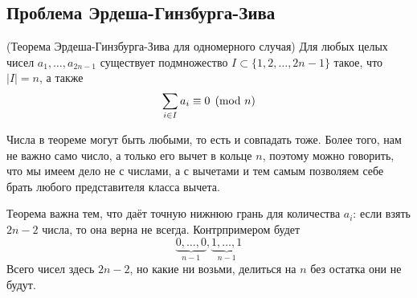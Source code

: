 \subsection{Проблема Эрдеша-Гинзбурга-Зива}

\begin{theorem} (Теорема Эрдеша-Гинзбурга-Зива для одномерного случая)
	Для любых целых чисел $a_1, \ldots, a_{2n - 1}$ существует подмножество $I \subset \{1, 2, \ldots, 2n - 1\}$ такое, что $|I| = n$, а также
	\[
		\sum\limits_{i \in I} a_i \equiv 0 \pmod n
	\]
\end{theorem}

\begin{note}
	Числа в теореме могут быть любыми, то есть и совпадать тоже. Более того, нам не важно само число, а только его вычет в кольце $n$, поэтому можно говорить, что мы имеем дело не с числами, а с вычетами и тем самым позволяем себе брать любого представителя класса вычета.
	
	Теорема важна тем, что даёт точную нижнюю грань для количества $a_i$: если взять $2n - 2$ числа, то она верна не всегда. Контрпримером будет
	\[
		\underbrace{0, \ldots, 0}_{n - 1}, \underbrace{1, \ldots, 1}_{n - 1}
	\]
	Всего чисел здесь $2n - 2$, но какие ни возьми, делиться на $n$ без остатка они не будут.
\end{note}

